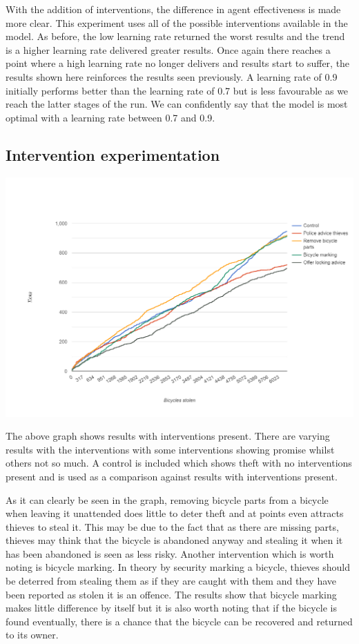 \documentclass[11pt]{informatics-report}
\begin{document}
With the addition of interventions, the difference in agent effectiveness is made more clear. This experiment uses all of the possible interventions available in the model. As before, the low learning rate returned the worst results and the trend is a higher learning rate delivered greater results. Once again there reaches a point where a high learning rate no longer delivers and results start to suffer, the results shown here reinforces the results seen previously. A learning rate of 0.9 initially performs better than the learning rate of 0.7 but is less favourable as we reach the latter stages of the run. We can confidently say that the model is most optimal with a learning rate between 0.7 and 0.9.

\subsection{Intervention experimentation}
\includegraphics[width = 1\textwidth]{all.png}

The above graph shows results with interventions present. There are varying results with the interventions with some interventions showing promise whilst others not so much. A control is included which shows theft with no interventions present and is used as a comparison against results with interventions present. \par

As it can clearly be seen in the graph, removing bicycle parts from a bicycle when leaving it unattended does little to deter theft and at points even attracts thieves to steal it. This may be due to the fact that as there are missing parts, thieves may think that the bicycle is abandoned anyway and stealing it when it has been abandoned is seen as less risky. Another intervention which is worth noting is bicycle marking. In theory by security marking a bicycle, thieves should be deterred from stealing them as if they are caught with them and they have been reported as stolen it is an offence. The results show that bicycle marking makes little difference by itself but it is also worth noting that if the bicycle is found eventually, there is a chance that the bicycle can be recovered and returned to its owner. \par
\end{document}
